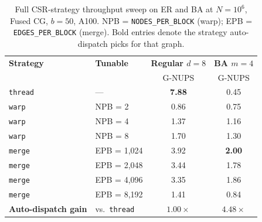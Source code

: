 \begin{table}[H]
\caption{Full CSR-strategy throughput sweep on ER and BA at $N = 10^6$, Fused CG, $b = 50$, A100. NPB = \texttt{NODES\_PER\_BLOCK} (warp); EPB = \texttt{EDGES\_PER\_BLOCK} (merge). Bold entries denote the strategy auto-dispatch picks for that graph.}
\label{tab:degree_dispatch_sweep}
\centering
\begin{tabular*}{\linewidth}{@{}llcc@{}}
\toprule
\textbf{Strategy}             & \textbf{Tunable}   & \textbf{Regular $d=8$} & \textbf{BA $m=4$} \\
                              &                    & G-NUPS               & G-NUPS \\
\midrule
\texttt{thread}               & ---                & \textbf{7.88}        & 0.45 \\
\midrule
\texttt{warp}                 & NPB = 2            & 0.86                 & 0.75 \\
\texttt{warp}                 & NPB = 4            & 1.37                 & 1.16 \\
\texttt{warp}                 & NPB = 8            & 1.70                 & 1.30 \\
\midrule
\texttt{merge}                & EPB = 1{,}024      & 3.92                 & \textbf{2.00} \\
\texttt{merge}                & EPB = 2{,}048      & 3.44                 & 1.78 \\
\texttt{merge}                & EPB = 4{,}096      & 3.35                 & 1.86 \\
\texttt{merge}                & EPB = 8{,}192      & 1.41                 & 0.84 \\
\midrule
\textbf{Auto-dispatch gain}    & vs.\ \texttt{thread} & $1.00\times$       & $\mathbf{4.48\times}$ \\
\bottomrule
\end{tabular*}
\end{table}

